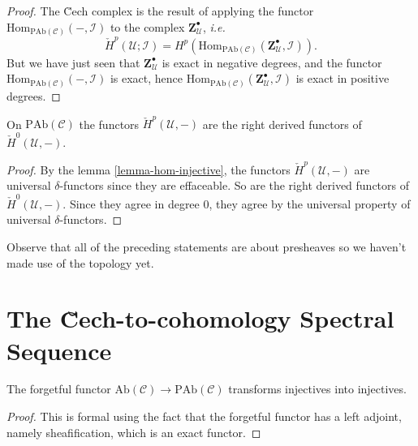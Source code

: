 \begin{proof}
The \u Cech complex is the result of applying the functor
$\text{Hom}_{\text{PAb}(\mathcal{C})}(-, \mathcal{I}) $ to the complex $
\mathbf{Z}^\bullet_\mathcal{U} $, {\it i.e.}
$$
\check H^p(\mathcal{U} ; \mathcal{I}) = H^p
(\text{Hom}_{\text{PAb}(\mathcal{C})} (\mathbf{Z}^\bullet_\mathcal{U},
\mathcal{I})).
$$
But we have just seen that $\mathbf{Z}^\bullet_\mathcal{U}$ is exact in
negative degrees, and the functor $\text{Hom}_{\text{PAb}(\mathcal{C})}(-,
\mathcal{I})$ is exact, hence $\text{Hom}_{\text{PAb}(\mathcal{C})}
(\mathbf{Z}^\bullet_\mathcal{U}, \mathcal{I})$ is exact in positive degrees.
\end{proof}

\begin{theorem}
\label{theorem-cech-derived}
On $\text{PAb}(\mathcal{C})$ the functors $\check{H}^p(\mathcal{U}, -)$ are
the right derived functors of $\check{H}^0(\mathcal{U}, -)$.
\end{theorem}

\begin{proof}
By the lemma \ref{lemma-hom-injective}, the functors $\check
H^p(\mathcal{U}, -)$ are universal $\delta$-functors since they are effaceable.
So are the right derived functors of $\check H^0(\mathcal{U}, -)$. Since they
agree in degree $0$, they agree by the universal property of universal
$\delta$-functors.
\end{proof}

\begin{remark}
\label{remark-presheaves-no-topology}
Observe that all of the preceding statements are about presheaves so we haven't
made use of the topology yet.
\end{remark}




\section{The \u Cech-to-cohomology Spectral Sequence}
\label{section-cech-ss}


\begin{lemma}
\label{lemma-forget-injectives}
The forgetful functor $\text{Ab}(\mathcal{C})\to \text{PAb}(\mathcal{C})$
transforms injectives into injectives.
\end{lemma}

\begin{proof}
This is formal using the fact that the forgetful functor has a left adjoint,
namely sheafification, which is an exact functor.
\end{proof}

